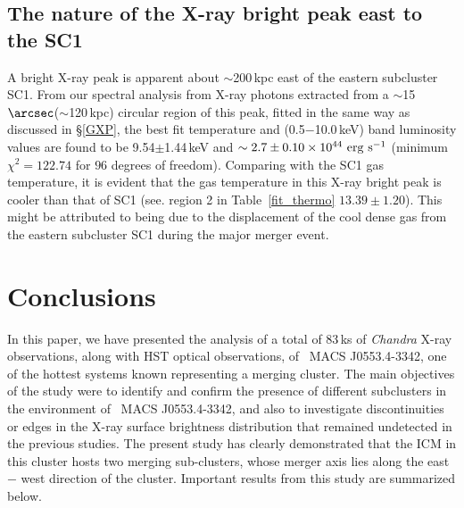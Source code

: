 \documentclass[useASM,usenatbib]{mn2e}
\newcommand{\mac}{\rm~MACS J0553.4-3342}
\begin{document}
\subsection{The nature of the  X-ray bright peak east to the SC1}
\label{Sec:SC0}
A bright X-ray peak is apparent about $\sim$200\,kpc east of
  the eastern subcluster SC1. From our spectral analysis from X-ray
  photons extracted from a $\sim$15$\arcsec$($\sim$120\,kpc) circular
  region of this peak, fitted in the same way as discussed in
  \S\ref{GXP}, the best fit temperature and (0.5$-$10.0\,keV) band luminosity values are
  found to be 9.54$\pm$1.44\,keV and
  $\sim2.7\pm0.10\times10^{44}{~\rm erg~s^{-1}}$ (minimum
  $\chi^2=122.74$ for $96$ degrees of freedom). Comparing with the SC1
  gas temperature, it is evident that the gas temperature in this X-ray   bright peak 
  is cooler than that of SC1 (see. region 2 in
  Table~\ref{fit_thermo} $13.39\pm1.20$). This might be attributed to
  being due to the displacement of the cool dense gas from the eastern
  subcluster SC1 during the major merger event.

\section{Conclusions}

In this paper, we have presented the analysis of a total of 83\,ks of
{\it Chandra} X-ray observations, along with HST optical observations,
of \mac, one of the hottest systems known representing a merging
cluster. The main objectives of the study were to identify and confirm
the presence of different subclusters in the environment of \mac, and also
to investigate discontinuities or edges in the X-ray surface
brightness distribution that remained undetected in the previous
studies. The present study has clearly demonstrated that the ICM in
this cluster hosts two merging sub-clusters, whose merger axis lies
along the east $-$ west direction of the cluster. Important results
from this study are summarized below.
\end{document}
